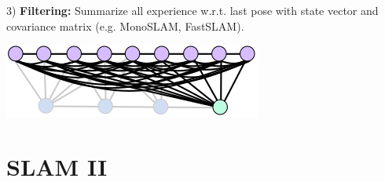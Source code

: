 \documentclass[landscape]{article}
\newcommand{\vmspace}{\vspace{-7pt}}
\begin{document}
\begin{multicols}{3}
\begin{minipage}{\columnwidth}
  3) \textbf{Filtering:} Summarize all experience w.r.t. last pose with state
  vector and covariance matrix (e.g. MonoSLAM, FastSLAM).
  \vspace{-8pt}
  \begin{center}
    \includegraphics[width=0.5\columnwidth]{img/10_FilteringSLAM.png}
  \end{center}
\end{minipage}



\vfill


\section{SLAM II}

\vmspace


\end{multicols}
\end{document}
